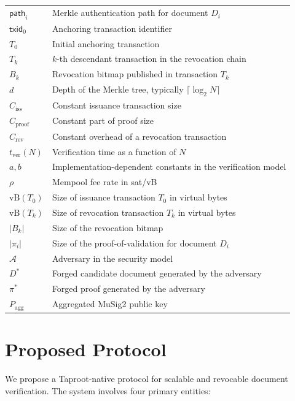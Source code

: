 \documentclass{IEEEoj}
\begin{document}
\begin{table}[!t]
\begin{tabular}{ll}
$\mathsf{path}_i$ & Merkle authentication path for document $D_i$ \\
$\mathsf{txid}_0$ & Anchoring transaction identifier \\
$T_0$ & Initial anchoring transaction \\
$T_k$ & $k$-th descendant transaction in the revocation chain \\
$B_k$ & Revocation bitmap published in transaction $T_k$ \\
$d$ & Depth of the Merkle tree, typically $\lceil \log_2 N \rceil$ \\
$C_{\mathrm{iss}}$ & Constant issuance transaction size \\
$C_{\mathrm{proof}}$ & Constant part of proof size \\
$C_{\mathrm{rev}}$ & Constant overhead of a revocation transaction \\
$t_{\mathrm{ver}}(N)$ & Verification time as a function of $N$ \\
$a,b$ & Implementation-dependent constants in the verification model \\
$\rho$ & Mempool fee rate in sat/vB \\
$\mathrm{vB}(T_0)$ & Size of issuance transaction $T_0$ in virtual bytes \\
$\mathrm{vB}(T_k)$ & Size of revocation transaction $T_k$ in virtual bytes \\
$|B_k|$ & Size of the revocation bitmap \\
$|\pi_i|$ & Size of the proof-of-validation for document $D_i$ \\
$\mathcal{A}$ & Adversary in the security model \\
$D^*$ & Forged candidate document generated by the adversary \\
$\pi^*$ & Forged proof generated by the adversary \\
$P_{\mathrm{agg}}$ & Aggregated MuSig2 public key \\
\hline
\end{tabular}
\end{table}


\section{Proposed Protocol}
\label{sec.proposedwork}
We propose a Taproot-native protocol for scalable and revocable document verification.
The system involves four primary entities:
\end{document}
